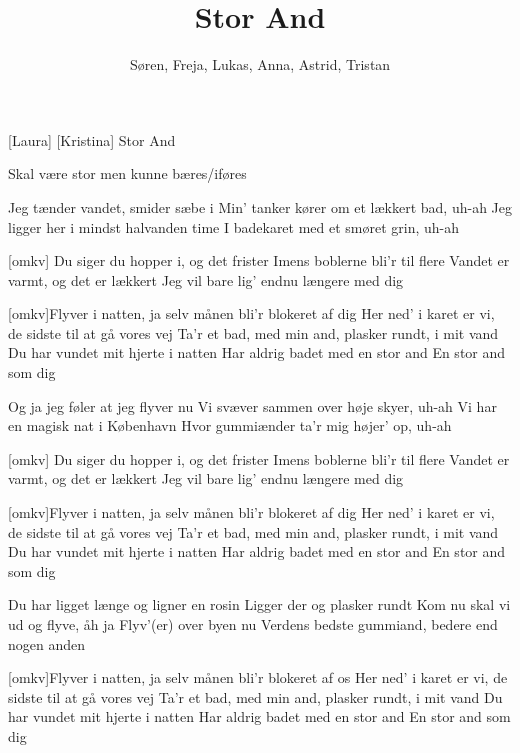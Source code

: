 \documentclass[a4paper,11pt]{article}
\title{Stor And}
\author{Søren, Freja, Lukas, Anna, Astrid, Tristan}
\begin{document}
\maketitle

\begin{roles}
    [Laura]
[Kristina] Stor And 
\end{roles}

\begin{props}
 Skal være stor men kunne bæres/iføres
\end{props}

\begin{song}
   Jeg tænder vandet, smider sæbe i
Min’ tanker kører om et lækkert bad, uh-ah
Jeg ligger her i mindst halvanden time
I badekaret med et smøret grin, uh-ah


  [omkv] Du siger du hopper i, og det frister
Imens boblerne bli’r til flere
Vandet er varmt, og det er lækkert
Jeg vil bare lig’ endnu længere med dig

  [omkv]Flyver i natten, ja selv månen bli’r blokeret af dig
Her ned’ i karet er vi, de sidste til at gå vores vej
Ta’r et bad, med min and, plasker rundt, i mit vand
Du har vundet mit hjerte i natten
Har aldrig badet med en stor and
En stor and som dig


 Og ja jeg føler at jeg flyver nu
Vi svæver sammen over høje skyer, uh-ah
Vi har en magisk nat i København
Hvor gummiænder ta’r mig højer’ op, uh-ah


  [omkv] Du siger du hopper i, og det frister
Imens boblerne bli’r til flere
Vandet er varmt, og det er lækkert
Jeg vil bare lig’ endnu længere med dig

  [omkv]Flyver i natten, ja selv månen bli’r blokeret af dig
Her ned’ i karet er vi, de sidste til at gå vores vej
Ta’r et bad, med min and, plasker rundt, i mit vand
Du har vundet mit hjerte i natten
Har aldrig badet med en stor and
En stor and som dig

 Du har ligget længe og ligner en rosin 
Ligger der og plasker rundt
Kom nu skal vi ud og flyve, åh ja
Flyv’(er) over byen nu 
Verdens bedste gummiand, bedere end nogen anden

[omkv]Flyver i natten, ja selv månen bli’r blokeret af os
Her ned’ i karet er vi, de sidste til at gå vores vej
Ta’r et bad, med min and, plasker rundt, i mit vand
Du har vundet mit hjerte i natten
Har aldrig badet med en stor and
En stor and som dig

\end{song}
\end{document}
